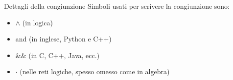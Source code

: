 \documentclass[aspectratio=169,10pt,dvipsnames,handout]{beamer}
\begin{document}
\begin{frame}{Dettagli della congiunzione}
    Simboli usati per scrivere la congiunzione sono:
    \begin{itemize}
        \item \alert{$\land$ (in logica)}
        \item \alert{and (in inglese, Python e C++)}
        \item $\texttt{\&\&}$ (in C, C++, Java, ecc.)
        \item $\cdot$ (nelle reti logiche, spesso omesso come in algebra)
    \end{itemize}

\end{frame}
\end{document}
